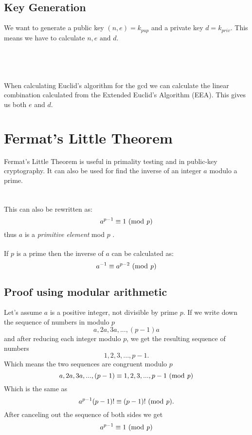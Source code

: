 \documentclass{article}
\begin{document}
	\subsection*{Key Generation \cite{rsa-generation}}
	We want to generate a public key $(n,e) = k_{pup}$ and a private key $d = k_{priv}$. This means we have to calculate $n,e \text{ and }d$.
	\\
	\\
	\\
	\\
	\\
	When calculating Euclid's algorithm for the gcd we can calculate the linear combination calculated from the Extended Euclid's Algorithm (EEA). This gives us both $e$ and $d$.
	
	\section*{Fermat's Little Theorem} 
	Fermat's Little Theorem is useful in primality testing and in public-key cryptography. It can also be used for find the inverse of  an integer $a$ modulo a prime. \cite{fermatsummary}
	\\
	\\
	\\

	This can also be rewritten as: 
	$$
	a^{p-1} \equiv 1 \text{ (mod \textit{p})}
	$$
	thus $a$ is a \textit{primitive element} mod $p$ \cite{numbertheory}.  \\
	\\
	If $p$ is a prime then the inverse of $a$ can be calculated as:
	$$
	a^{-1} \equiv a^{p-2} \text{ (mod \textit{p})}
	$$
	
 	\subsection*{Proof using modular arithmetic \cite{fermatproof}}
 	Let's assume $a$ is a positive integer, not divisible by prime $p$. If we write down the sequence of numbers in modulo $p$
 	$$
 	a,2a,3a,...,(p-1)a
 	$$
 	and after reducing each integer modulo $p$, we get the resulting sequence of numbers
 	$$
 	1,2,3,...,p-1.
 	$$
 	Which means the two sequences are congruent modulo $p$ 
 	$$
 	a,2a,3a,...,(p-1) \equiv 1,2,3,...,p-1 \text{ (mod \textit{p})}
 	$$
 	Which is the same as 
 	$$
 	a^{p-1}(p-1)! \equiv (p-1)! \text{ (mod \textit{p})}.
 	$$
 	After canceling out the sequence of both sides we get
 	$$
	a^{p-1} \equiv 1 \text{ (mod \textit{p})}
 	$$
 	
\end{document}
